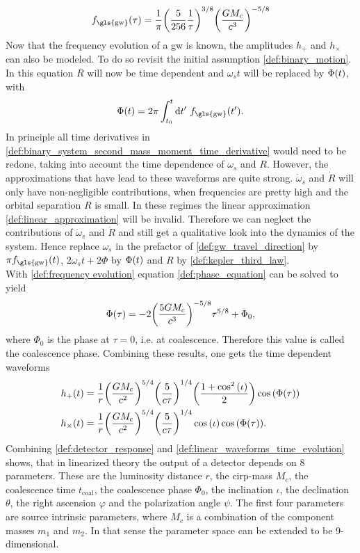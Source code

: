\begin{equation}\label{def:frequency evolution}
f_\text{\gls{gw}}\lr{\tau} = \frac{1}{\pi}\lr{\frac{5}{256}\frac{1}{\tau}}^{3/8}\lr{\frac{G M_c}{c^3}}^{-5/8}
\end{equation}
Now that the frequency evolution of a \gls{gw} is known, the amplitudes $h_+$ and $h_\times$ can also be modeled. To do so revisit the initial assumption \eqref{def:binary_motion}. In this equation $R$ will now be time dependent and $\omega_s t$ will be replaced by $\Phi{\left( t \right)}$, with
\begin{equation}\label{def:phase_equation}
\Phi\lr{t} = 2\pi \int_{t_0}^t\diff t'\ f_\text{\gls{gw}}\lr{t'}.
\end{equation}
In principle all time derivatives in \eqref{def:binary_system_second_mass_moment_time_derivative} would need to be redone, taking into account the time dependence of $\omega_s$ and $R$. However, the approximations that have lead to these waveforms are quite strong. $\dot{\omega}_s$ and $\dot{R}$ will only have non-negligible contributions, when frequencies are pretty high and the orbital separation $R$ is small. In these regimes the linear approximation \eqref{def:linear_approximation} will be invalid. Therefore we can neglect the contributions of $\dot{\omega}_s$ and $\dot{R}$ and still get a qualitative look into the dynamics of the system. Hence replace $\omega_s$ in the prefactor of \eqref{def:gw_travel_direction} by $\pi f_\text{\gls{gw}}\lr{t}$, $2\omega_s t + 2 \Phi$ by $\Phi{\left( t \right)}$ and $R$ by \eqref{def:kepler_third_law}.\\
With \eqref{def:frequency evolution} equation \eqref{def:phase_equation} can be solved to yield
\begin{equation}
\Phi{\left( \tau \right)}=-2{\left( \frac{5 G M_c}{c^3} \right)}^{-5/8}\tau^{5/8}+\Phi_0,
\end{equation}
where $\Phi_0$ is the phase at $\tau=0$, i.e. at coalescence. Therefore this value is called the coalescence phase. Combining these results, one gets the time dependent waveforms
\begin{align}\label{def:linear_waveforms_time_evolution}
h_+{\left( t \right)} & = \frac{1}{r}{\left( \frac{G M_c}{c^2} \right)}^{5/4}{\left( \frac{5}{c\tau} \right)}^{1/4}{\left( \frac{1+\cos^2{\left( \iota \right)}}{2} \right)}\cos{\left( \Phi{\left( \tau \right)} \right)}\nonumber\\
h_\times{\left( t \right)} & = \frac{1}{r}{\left( \frac{G M_c}{c^2} \right)}^{5/4}{\left( \frac{5}{c\tau} \right)}^{1/4}\cos{\left( \iota \right)}\cos{\left( \Phi{\left( \tau \right)} \right)}.
\end{align}
Combining \eqref{def:detector_response} and \eqref{def:linear_waveforms_time_evolution} shows, that in linearized theory the output of a detector depends on 8 parameters. These are the luminosity distance $r$, the cirp-mass $M_c$, the coalescence time $t_\text{coal}$, the coalescence phase $\Phi_0$, the inclination $\iota$, the declination $\theta$, the right ascension $\varphi$ and the polarization angle $\psi$. The first four parameters are source intrinsic parameters, where $M_c$ is a combination of the component masses $m_1$ and $m_2$. In that sense the parameter space can be extended to be 9-dimensional.\\
